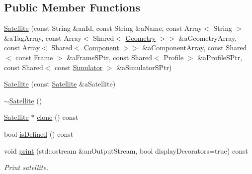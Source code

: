 \subsection*{Public Member Functions}
\begin{DoxyCompactItemize}
\item 
\hyperlink{classostk_1_1simulation_1_1_satellite_afda29251d6d1bb5b6921248772b7d8c4}{Satellite} (const String \&an\+Id, const String \&a\+Name, const Array$<$ String $>$ \&a\+Tag\+Array, const Array$<$ Shared$<$ \hyperlink{classostk_1_1simulation_1_1component_1_1_geometry}{Geometry} $>$$>$ \&a\+Geometry\+Array, const Array$<$ Shared$<$ \hyperlink{classostk_1_1simulation_1_1_component}{Component} $>$$>$ \&a\+Component\+Array, const Shared$<$ const Frame $>$ \&a\+Frame\+S\+Ptr, const Shared$<$ Profile $>$ \&a\+Profile\+S\+Ptr, const Shared$<$ const \hyperlink{classostk_1_1simulation_1_1_simulator}{Simulator} $>$ \&a\+Simulator\+S\+Ptr)
\item 
\hyperlink{classostk_1_1simulation_1_1_satellite_adb01c7d30bfc51144067e5a92709c638}{Satellite} (const \hyperlink{classostk_1_1simulation_1_1_satellite}{Satellite} \&a\+Satellite)
\item 
\hyperlink{classostk_1_1simulation_1_1_satellite_af6f1e69609eca81bda731d176a0f3786}{$\sim$\+Satellite} ()
\item 
\hyperlink{classostk_1_1simulation_1_1_satellite}{Satellite} $\ast$ \hyperlink{classostk_1_1simulation_1_1_satellite_a9828fe3ec02b8f4d8b2faf8412826f00}{clone} () const
\item 
bool \hyperlink{classostk_1_1simulation_1_1_satellite_a124ee57d73d12788466ba203b126fc57}{is\+Defined} () const
\item 
void \hyperlink{classostk_1_1simulation_1_1_satellite_ac7f5b5462deb081eb93115f0fb362acd}{print} (std\+::ostream \&an\+Output\+Stream, bool display\+Decorators=true) const
\begin{DoxyCompactList}\small\item\em Print satellite. \end{DoxyCompactList}\end{DoxyCompactItemize}
